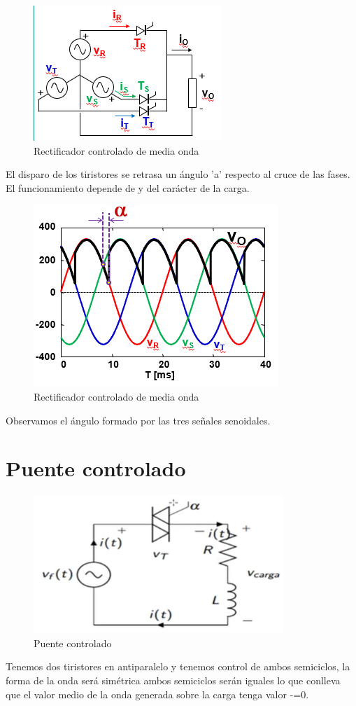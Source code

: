 \documentclass[12pt,a4paper]{article}
\begin{document}
\begin{figure}[hbtp]
\centering
\includegraphics[scale=1]{Circuitos/1.png}
\caption{Rectificador controlado de media onda}
\end{figure}
El disparo de los tiristores se retrasa un ángulo 'a' respecto al cruce de las fases.\\
El funcionamiento depende de y del carácter de la carga. 
\newpage
\begin{figure}[hbtp]
\centering
\includegraphics[scale=1]{Circuitos/2.png}
\caption{Rectificador controlado de media onda}
\end{figure}
Observamos el ángulo formado por las tres señales senoidales. 

\section*{Puente controlado}
\begin{figure}[hbtp]
\centering
\includegraphics[scale=1]{Circuitos/1_1.png}
\caption{Puente controlado}
\end{figure}
Tenemos dos tiristores en antiparalelo y tenemos control de ambos semiciclos, la forma de la onda será simétrica ambos semiciclos serán iguales lo que conlleva que el valor medio de la onda generada sobre la carga tenga valor -=0.
\end{document}
